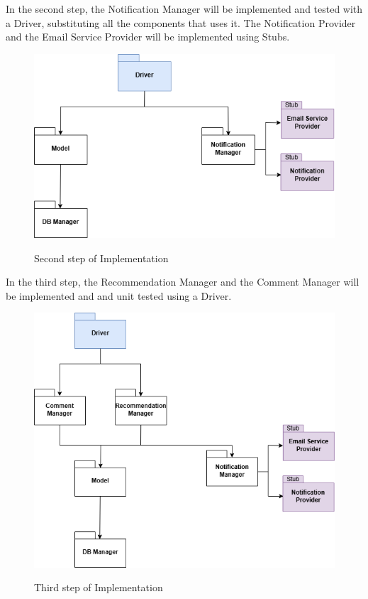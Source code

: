\documentclass[a4paper,12pt]{article}
\begin{document}
In the second step, the Notification Manager will be implemented and tested with a Driver, substituting all the components that uses it. The Notification Provider and the Email Service Provider will be implemented using Stubs.

\begin{figure}[H]
\centering
\includegraphics[scale = 0.7]{DD_figures/ImplementationDiagrams/SecondStep.png}\\
\caption{Second step of Implementation}
\end{figure}
\newpage

In the third step, the Recommendation Manager and the Comment Manager will be implemented and and unit tested using a Driver.

\begin{figure}[H]
\centering
\includegraphics[scale = 0.7]{DD_figures/ImplementationDiagrams/ThirdStep.png}\\
\caption{Third step of Implementation}
\end{figure}
\newpage
\end{document}

